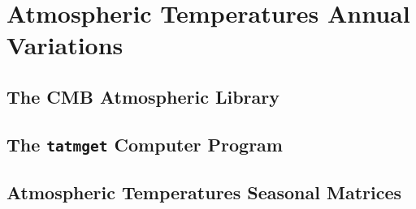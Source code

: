 \chapter{Atmospheric Temperatures Annual Variations}

\section{The CMB Atmospheric Library}

\section{The \texttt{tatmget} Computer Program}

\section{Atmospheric Temperatures Seasonal Matrices}
